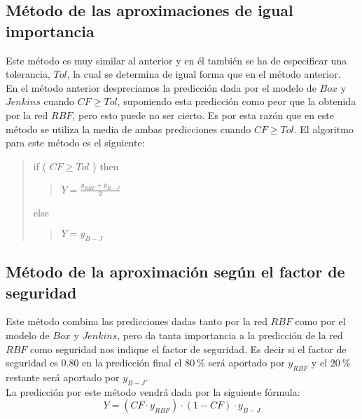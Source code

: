 \subsection{M\'etodo de las aproximaciones de igual importancia}

Este m\'etodo es muy similar al anterior y en \'el tambi\'en se ha de
especificar una tolerancia, $Tol$, la cual se determina de igual forma que en el
m\'etodo anterior.\\

En el m\'etodo anterior despreciamos la predicci\'on dada por el modelo de
$Box$ y $Jenkins$ cuando $CF\geq Tol$, suponiendo esta predicci\'on como peor
que la obtenida por la red $RBF$, pero esto puede no ser cierto. Es por esta
raz\'on que en este m\'etodo se utiliza la media de ambas predicciones cuando
$CF\geq Tol$. El algoritmo para este m\'etodo es el siguiente:
\begin{quote}
if ( $CF\geq Tol$ ) then
\begin{quote}
$Y=\frac{y_{RBF}+y_{B-J}}{2}$
\end{quote}
else
\begin{quote}
$Y=y_{B-J}$
\end{quote}
\end{quote}
\newpage
\subsection{M\'etodo de la aproximaci\'on seg\'un el factor de seguridad}

Este m\'etodo combina las predicciones dadas tanto por la red $RBF$ como por el
modelo de $Box$ y $Jenkins$, pero da tanta importancia a la predicci\'on de la
red $RBF$ como seguridad nos indique el factor de seguridad. Es decir si el 
factor de seguridad es $0.80$ en la predicci\'on final el $80\ \%$ ser\'a
aportado por $y_{RBF}$ y el $20\ \%$ restante ser\'a aportado por $y_{B-J}$.\\

La predicci\'on por este m\'etodo vendr\'a dada por la siguiente f\'ormula:
\begin{displaymath}
Y=(CF\cdot y_{RBF})\cdot (1-CF)\cdot y_{B-J}
\end{displaymath}
